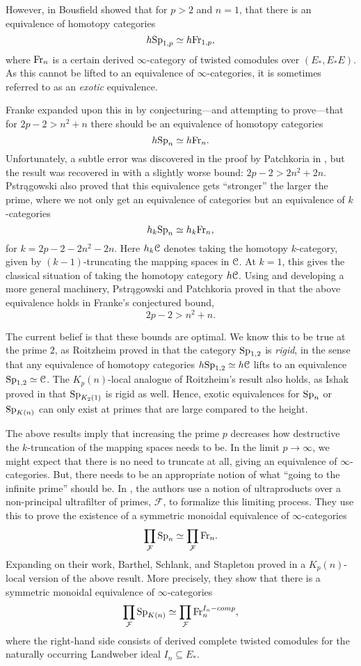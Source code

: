However, in \cite{bousfield_1985} Bousfield showed that for $p>2$ and $n=1$, that there is an equivalence of homotopy categories
\[h \mathrm{Sp}_{1,p}\simeq h \mathrm{Fr}_{1,p},\]
where $\mathrm{Fr}_{n}$ is a certain derived $\infty$-category of twisted comodules over $(E_*, E_*E)$. As this cannot be lifted to an equivalence of $\infty$-categories, it is sometimes referred to as an \emph{exotic} equivalence. 

Franke expanded upon this in \cite{franke_96} by conjecturing---and attempting to prove---that for $2p-2 > n^2+n$ there should be an equivalence of homotopy categories
\[h \mathrm{Sp}_{n}\simeq h \mathrm{Fr}_{n}.\]
Unfortunately, a subtle error was discovered in the proof by Patchkoria in \cite{patchkoria_2013}, but the result was recovered in \cite{pstragowski_2021} with a slightly worse bound: $2p-2>2n^2+2n$. Pstr{\k a}gowski also proved that this equivalence gets ``stronger'' the larger the prime, where we not only get an equivalence of categories but an equivalence of $k$-categories 
\[h_k \mathrm{Sp}_{n}\simeq h_k \mathrm{Fr}_{n},\]
for $k=2p-2-2n^2-2n$. Here $h_k \EuScript{C}$ denotes taking the homotopy $k$-category, given by $(k-1)$-truncating the mapping spaces in $\EuScript{C}$. At $k=1$, this gives the classical situation of taking the homotopy category $h\EuScript{C}$. Using and developing a more general machinery, Pstr{\k a}gowski and Patchkoria proved in \cite{patchkoria-pstragowski_2021} that the above equivalence holds in Franke's conjectured bound, 
\[2p-2>n^2+n.\] 

The current belief is that these bounds are optimal. We know this to be true at the prime $2$, as Roitzheim proved in \cite{roitzheim_07} that the category $\mathrm{Sp}_{1,2}$ is \emph{rigid}, in the sense that any equivalence of homotopy categories $h\mathrm{Sp}_{1,2} \simeq h\EuScript{C}$ lifts to an equivalence $\mathrm{Sp}_{1,2}\simeq \EuScript{C}$. The $K_p(n)$-local analogue of Roitzheim's result also holds, as Ishak proved in \cite{ishak_19} that $\mathrm{Sp}_{K_2(1)}$ is rigid as well. Hence, exotic equivalences for $\mathrm{Sp}_{n}$ or $\mathrm{Sp}_{{K(n)}}$ can only exist at primes that are large compared to the height. 

The above results imply that increasing the prime $p$ decreases how destructive the $k$-truncation of the mapping spaces needs to be. In the limit $p\rightarrow \infty$, we might expect that there is no need to truncate at all, giving an equivalence of $\infty$-categories. But, there needs to be an appropriate notion of what ``going to the infinite prime'' should be. In \cite{barthel-schlank-stapleton_2020}, the authors use a notion of ultraproducts over a non-principal ultrafilter of primes, $\mathcal{F}$, to formalize this limiting process. They use this to prove the existence of a symmetric monoidal equivalence of $\infty$-categories
\[\prod_{\mathcal{F}}\mathrm{Sp}_{n} \simeq \prod_{\mathcal{F}}\mathrm{Fr}_{n}.\] 
Expanding on their work, Barthel, Schlank, and Stapleton proved in \cite{barthel-schlank-stapleton_2021} a $K_p(n)$-local version of the above result. More precisely, they show that there is a symmetric monoidal equivalence of $\infty$-categories
\[\prod_{\mathcal{F}}\mathrm{Sp}_{{K(n)}} \simeq \prod_{\mathcal{F}}\mathrm{Fr}_{n}^{I_n-comp},\]
where the right-hand side consists of derived complete twisted comodules for the naturally occurring Landweber ideal $I_n\subseteq E_*$. 


